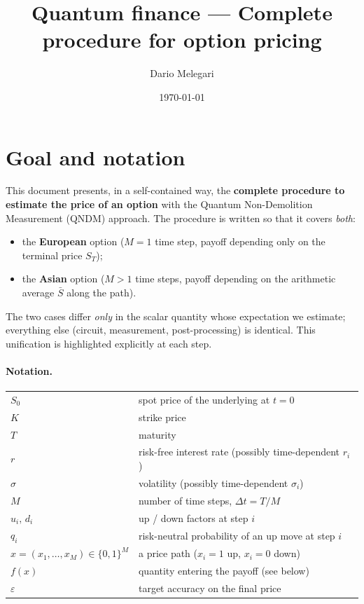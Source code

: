 \documentclass{article}
\title{Quantum finance --- Complete procedure for option pricing}
\author{Dario Melegari}
\date{\today}
\newcommand{\deltat}{\Delta t}
\begin{document}
\maketitle
\tableofcontents

\newpage

\section{Goal and notation}

This document presents, in a self-contained way, the \textbf{complete procedure to estimate the price of an option} with the Quantum Non-Demolition Measurement (QNDM) approach. The procedure is written so that it covers \emph{both}:
\begin{itemize}
    \item the \textbf{European} option ($M=1$ time step, payoff depending only on the terminal price $S_T$);
    \item the \textbf{Asian} option ($M>1$ time steps, payoff depending on the arithmetic average $\bar{S}$ along the path).
\end{itemize}
The two cases differ \emph{only} in the scalar quantity whose expectation we estimate; everything else (circuit, measurement, post-processing) is identical. This unification is highlighted explicitly at each step.

\paragraph{Notation.}
\begin{center}
\begin{tabular}{ll}
\hline
$S_0$ & spot price of the underlying at $t=0$ \\
$K$ & strike price \\
$T$ & maturity \\
$r$ & risk-free interest rate (possibly time-dependent $r_i$) \\
$\sigma$ & volatility (possibly time-dependent $\sigma_i$) \\
$M$ & number of time steps, $\deltat = T/M$ \\
$u_i,\,d_i$ & up / down factors at step $i$ \\
$q_i$ & risk-neutral probability of an up move at step $i$ \\
$x=(x_1,\dots,x_M)\in\{0,1\}^M$ & a price path ($x_i=1$ up, $x_i=0$ down) \\
$f(x)$ & quantity entering the payoff (see below) \\
$\varepsilon$ & target accuracy on the final price \\
\hline
\end{tabular}
\end{center}
\end{document}

